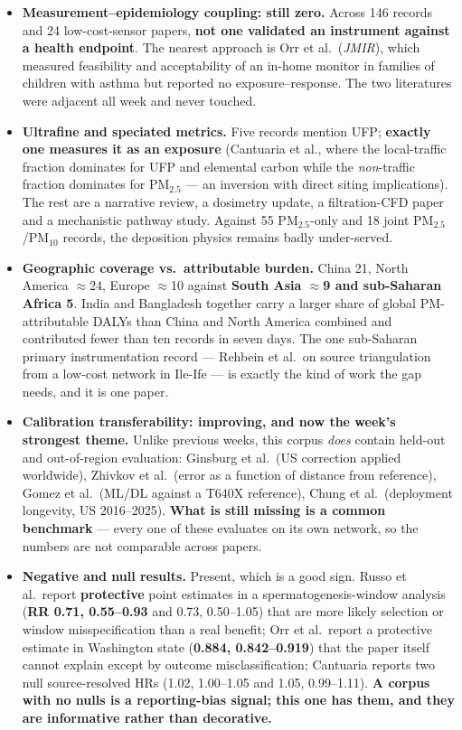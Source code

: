 \documentclass[10pt]{article}
\begin{document}
\footnotesize
\begin{itemize}
\item \textbf{Measurement--epidemiology coupling: still zero.} Across 146 records and 24
low-cost-sensor papers, \textbf{not one validated an instrument against a health
endpoint}. The nearest approach is Orr et al.\ (\textit{JMIR}), which measured
feasibility and acceptability of an in-home monitor in families of children with asthma
but reported no exposure--response. The two literatures were adjacent all week and never
touched.

\item \textbf{Ultrafine and speciated metrics.} Five records mention UFP; \textbf{exactly
one measures it as an exposure} (Cantuaria et al., where the local-traffic fraction
dominates for UFP and elemental carbon while the \emph{non}-traffic fraction dominates for
PM$_{2.5}$ --- an inversion with direct siting implications). The rest are a narrative
review, a dosimetry update, a filtration-CFD paper and a mechanistic pathway study.
Against 55 PM$_{2.5}$-only and 18 joint PM$_{2.5}$/PM$_{10}$ records, the deposition
physics remains badly under-served.

\item \textbf{Geographic coverage vs.\ attributable burden.} China 21, North America
$\approx$24, Europe $\approx$10 against \textbf{South Asia $\approx$9 and sub-Saharan
Africa 5}. India and Bangladesh together carry a larger share of global PM-attributable
DALYs than China and North America combined and contributed fewer than ten records in
seven days. The one sub-Saharan primary instrumentation record --- Rehbein et al.\ on
source triangulation from a low-cost network in Ile-Ife --- is exactly the kind of work the
gap needs, and it is one paper.

\item \textbf{Calibration transferability: improving, and now the week's strongest
theme.} Unlike previous weeks, this corpus \emph{does} contain held-out and out-of-region
evaluation: Ginsburg et al.\ (US correction applied worldwide), Zhivkov et al.\
(error as a function of distance from reference), Gomez et al.\ (ML/DL against a T640X
reference), Chung et al.\ (deployment longevity, US 2016--2025). \textbf{What is still
missing is a common benchmark} --- every one of these evaluates on its own network, so the
numbers are not comparable across papers.

\item \textbf{Negative and null results.} Present, which is a good sign. Russo et al.\
report \textbf{protective} point estimates in a spermatogenesis-window analysis
(\textbf{RR 0.71, 0.55--0.93} and 0.73, 0.50--1.05) that are more likely selection or
window misspecification than a real benefit; Orr et al.\ report a protective estimate in
Washington state (\textbf{0.884, 0.842--0.919}) that the paper itself cannot explain
except by outcome misclassification; Cantuaria reports two null source-resolved HRs
(1.02, 1.00--1.05 and 1.05, 0.99--1.11). \textbf{A corpus with no nulls is a
reporting-bias signal; this one has them, and they are informative rather than
decorative.}
\end{itemize}
\end{document}
